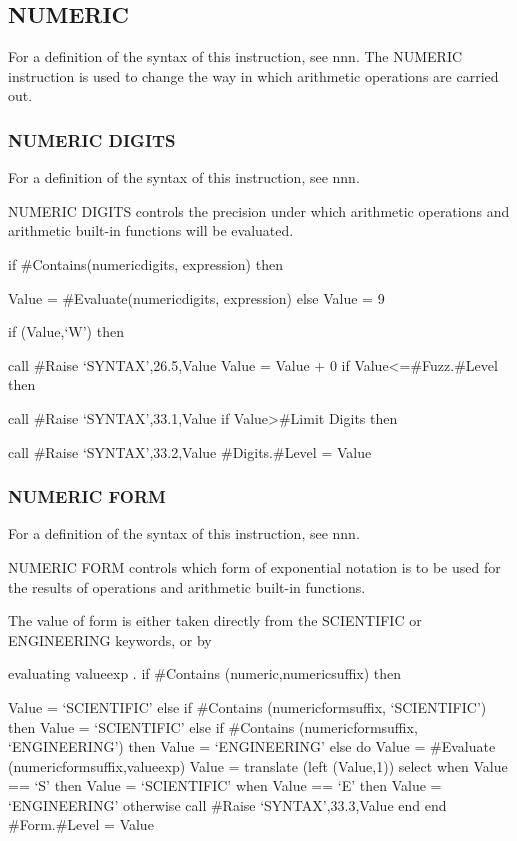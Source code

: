 \hypertarget{numeric}{%
\subsection{NUMERIC}\label{numeric}}

For a definition of the syntax of this instruction, see nnn. The NUMERIC
instruction is used to change the way in which arithmetic operations are
carried out.

\hypertarget{numeric-digits}{%
\subsubsection{NUMERIC DIGITS}\label{numeric-digits}}

For a definition of the syntax of this instruction, see nnn.

NUMERIC DIGITS controls the precision under which arithmetic operations
and arithmetic built-in functions will be evaluated.

if \#Contains(numericdigits, expression) then

Value = \#Evaluate(numericdigits, expression) else Value = 9

if \datatype(Value,`W') then

call \#Raise `SYNTAX',26.5,Value Value = Value + 0 if
Value\textless=\#Fuzz.\#Level then

call \#Raise `SYNTAX',33.1,Value if Value\textgreater\#Limit Digits then

call \#Raise `SYNTAX',33.2,Value \#Digits.\#Level = Value

\hypertarget{numeric-form}{%
\subsubsection{NUMERIC FORM}\label{numeric-form}}

For a definition of the syntax of this instruction, see nnn.

NUMERIC FORM controls which form of exponential notation is to be used
for the results of operations and arithmetic built-in functions.

The value of form is either taken directly from the SCIENTIFIC or
ENGINEERING keywords, or by

evaluating valueexp . if \#Contains (numeric,numericsuffix) then

Value = `SCIENTIFIC' else if \#Contains (numericformsuffix,
`SCIENTIFIC') then Value = `SCIENTIFIC' else if \#Contains
(numericformsuffix, `ENGINEERING') then Value = `ENGINEERING' else do
Value = \#Evaluate (numericformsuffix,valueexp) Value = translate (left
(Value,1)) select when Value == `S' then Value = `SCIENTIFIC' when Value
== `E' then Value = `ENGINEERING' otherwise call \#Raise
`SYNTAX',33.3,Value end end \#Form.\#Level = Value

